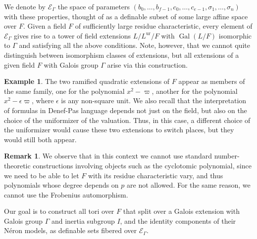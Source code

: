 \documentclass{amsart}
\newcommand{\gal}{\operatorname{Gal}}
\newcommand{\ur}{\mathrm{ur}}
\newcommand\cE{{\mathcal E}}
\theoremstyle{plain}
\theoremstyle{definition}
\newtheorem{rem}[thm]{Remark}
\newtheorem{example}[thm]{Example}
\begin{document}
We denote by $\cE_\Gamma$ the space of parameters $(b_0, \dots, b_{f-1}, c_0, \dots, c_{e-1}, \sigma_1, \dots, \sigma_n)$ with these properties, thought of as a definable subset of some large affine space over $F$. 
Given a field $F$ of sufficiently large residue characteristic, every element of $\cE_\Gamma$ gives rise to a tower of field extensions $L/L^\ur/F$ with $\gal(L/F)$ isomorphic to $\Gamma$ and satisfying all the above conditions. Note, however, that we cannot quite distinguish between 
isomorphism classes of extensions, but all extensions of a given field $F$ with Galois group 
$\Gamma$ arise via this construction.   
\begin{example}
The two ramified quadratic extensions of $F$ appear as members of the same family, one for the 
polynomial $x^2-\varpi$, another for the polynomial $x^2-\epsilon\varpi$, where $\epsilon$  is any non-square unit. We also recall that the interpretation of formulas in Denef-Pas language depends not just on the field, but also on the choice of the uniformizer of the valuation. Thus, in this case, a different choice of the uniformizer would cause these two extensions to switch places, but they would still both appear. 
\end{example}
\begin{rem} We observe that in this context we cannot use standard number-theoretic constructions involving objects such as the cyclotomic polynomial, since we need to be able to let $F$ with its residue characteristic vary, and thus polynomials whose degree depends on $p$ are not allowed. For the same reason, we cannot use the Frobenius automorphism.  
\end{rem}
Our goal is to construct all tori over $F$ that split over a Galois extension with Galois group 
$\Gamma$ and inertia subgroup $I$, and the identity components of their N\'eron models, as 
definable sets fibered over $\cE_\Gamma$.  
\end{document}
